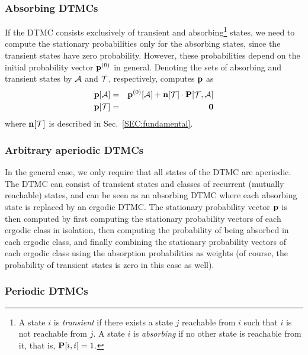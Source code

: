 \subsubsection{Absorbing DTMCs}

If the DTMC consists exclusively of transient and absorbing\footnote{
A state $i$ is \emph{transient} if there exists a state $j$ reachable from $i$
such that $i$ is not reachable from $j$.
A state $i$ is \emph{absorbing} if no other state is reachable from it,
that is, $\P[i,i] = 1$.
} states, we need to compute the
stationary probabilities only
for the absorbing states, since the transient states have zero probability.
However, these probabilities depend on the initial probability vector
$\vp^{(0)}$ in general.
Denoting the sets of absorbing and transient states by
$\aset$ and $\tset$, respectively, {\smart} computes $\vp$ as
\begin{eqnarray*}
 \vp[\Set{A}] 
 & = & 
 \vp^{(0)}[\Set{A}] + \vn[\Set{T}] \cdot \P[\Set{T}, \Set{A}]
 \\
 \vp[\Set{T}] 
 & = &
 \0
\end{eqnarray*}
where $\vn[\Set{T}]$ is described in Sec.~\ref{SEC:fundamental}.


\subsubsection{Arbitrary aperiodic DTMCs}

In the general case, we only require that all states of the DTMC are
aperiodic.
The DTMC can consist of transient states and classes of
recurrent (mutually reachable) states, and can be seen as an
absorbing DTMC where
each absorbing state is replaced by an ergodic DTMC.
The stationary probability vector $\vp$
is then computed by first computing the stationary probability vectors of each
ergodic class in isolation,
then computing the probability of being absorbed in each ergodic class, and
finally combining the stationary probability vectors of each ergodic class
using the absorption probabilities as weights (of course, the probability
of transient states is zero in this case as well).

\subsubsection{Periodic DTMCs}

